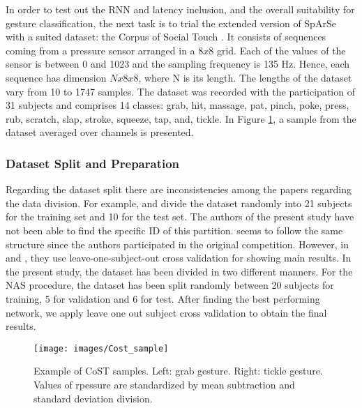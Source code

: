 \documentclass[a4paper, twocolumn]{article}
\begin{document}
In order to test out the RNN and latency inclusion, and the overall suitability for gesture classification, the next task is to trial the extended version of SpArSe with a suited dataset: the Corpus of Social Touch \cite{Jung2014}. It consists of sequences coming from a pressure sensor arranged in a $8x8$ grid. Each of the values of the sensor is between 0 and 1023 and the sampling frequency is 135 Hz. Hence, each sequence has dimension $Nx8x8$, where N is its length. The lengths of the dataset vary from 10 to 1747 samples. The dataset was recorded with the participation of 31 subjects and comprises 14 classes: grab, hit, massage, pat, pinch, poke, press, rub, scratch, slap, stroke, squeeze, tap, and, tickle. In Figure \ref{fig:costsample}, a sample from the dataset averaged over channels is presented.

\subsubsection{Dataset Split and Preparation}\label{SectionDataSplit}

Regarding the dataset split there are inconsistencies among the papers regarding the data division. For example, \cite{Hughes2017} and \cite{Jung2015} divide the dataset randomly into 21 subjects for the training set and 10 for the test set.  The authors of the present study have not been able to find the specific ID of this partition. \cite{Ta2015a} seems to follow the same structure since the authors participated in the original competition. However, in \cite{Albawi2018} and \cite{Jung2017}, they use leave-one-subject-out cross validation for showing main results. In the present study, the dataset has been divided in two different manners. For the NAS procedure, the dataset has been split randomly between 20 subjects for training, 5 for validation and 6 for test. After finding the best performing network, we apply leave one out subject cross validation to obtain the final results. 

\begin{figure}
	\centering
	\texttt{[image: images/Cost\_sample]}
	\caption{Example of CoST samples. Left: grab gesture. Right: tickle gesture. Values of rpessure are standardized by mean subtraction and standard deviation division.}
	\label{fig:costsample}
\end{figure}
\end{document}
